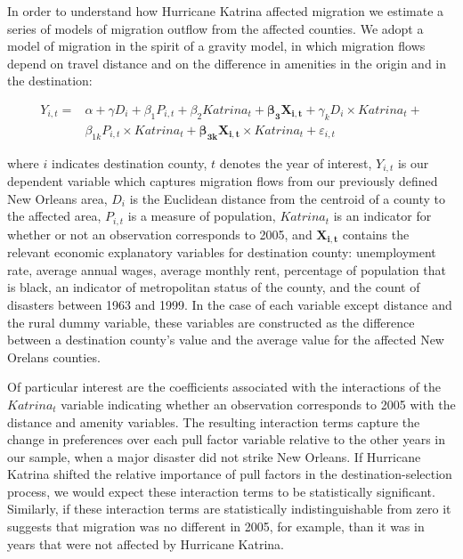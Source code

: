 \documentclass[]{article}
\begin{document}
In order to understand how Hurricane Katrina affected migration we
estimate a series of models of migration outflow from the affected
counties. We adopt a model of migration in the spirit of a gravity
model, in which migration flows depend on travel distance and on the
difference in amenities in the origin and in the destination:

\begin{equation} \label{eq:intreg}
\begin{split}
Y_{i,t} = &\alpha + \gamma {D}_{i} + \beta_1 {P}_{i,t} + \beta_2 {Katrina}_{t} + \mathbf{\beta_3} \mathbf{X_{i,t}} + \gamma_k {D}_{i} \times {Katrina}_{t} + \\
& \beta_{1k} {P}_{i,t} \times {Katrina}_{t} + \mathbf{\beta_{3k}} \mathbf{X_{i,t}} \times {Katrina}_{t} + \varepsilon_{i,t} 
\end{split}
\end{equation}

where \(i\) indicates destination county, \(t\) denotes the year of
interest, \(Y_{i,t}\) is our dependent variable which captures migration
flows from our previously defined New Orleans area, \({D}_{i}\) is the
Euclidean distance from the centroid of a county to the affected area,
\({P}_{i,t}\) is a measure of population, \({Katrina}_{t}\) is an
indicator for whether or not an observation corresponds to 2005, and
\(\mathbf{X_{i,t}}\) contains the relevant economic explanatory
variables for destination county: unemployment rate, average annual
wages, average monthly rent, percentage of population that is black, an
indicator of metropolitan status of the county, and the count of
disasters between 1963 and 1999. In the case of each variable except
distance and the rural dummy variable, these variables are constructed
as the difference between a destination county's value and the average
value for the affected New Orelans counties.

Of particular interest are the coefficients associated with the
interactions of the \({Katrina}_{t}\) variable indicating whether an
observation corresponds to 2005 with the distance and amenity variables.
The resulting interaction terms capture the change in preferences over
each pull factor variable relative to the other years in our sample,
when a major disaster did not strike New Orleans. If Hurricane Katrina
shifted the relative importance of pull factors in the
destination-selection process, we would expect these interaction terms
to be statistically significant. Similarly, if these interaction terms
are statistically indistinguishable from zero it suggests that migration
was no different in 2005, for example, than it was in years that were
not affected by Hurricane Katrina.
\end{document}
